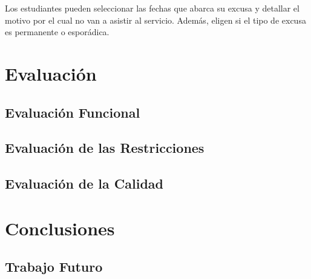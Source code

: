 \documentclass[stu, 12pt, letterpaper, donotrepeattitle, floatsintext, natbib]{apa7}
\begin{document}
Los estudiantes pueden seleccionar las fechas que abarca su excusa y detallar el motivo por el cual no van a asistir al servicio. Además, eligen si el tipo de excusa es permanente o esporádica.

\section{Evaluación}

\subsection{Evaluación Funcional}

\subsection{Evaluación de las Restricciones}

\subsection{Evaluación de la Calidad}


\section{Conclusiones}

\subsection{Trabajo Futuro}

\newpage
\renewcommand\refname{{\textbf{Referencias}}}

\end{document}
